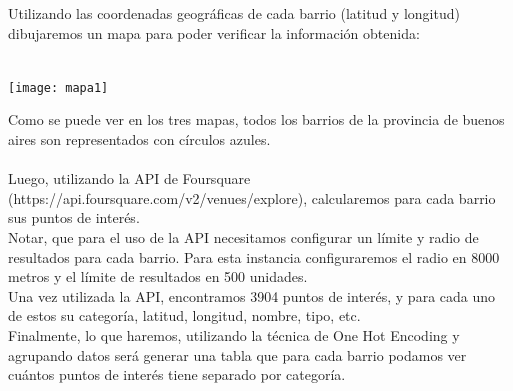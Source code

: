 \documentclass[12pt,a4paper]{tesis}
\begin{document}
Utilizando las coordenadas geográficas de cada barrio (latitud y longitud) dibujaremos un mapa para poder verificar la información obtenida:\\ \\
\centerline{
	\texttt{[image: mapa1]}
}


Como se puede ver en los tres mapas, todos los barrios de la provincia de buenos aires son representados con círculos azules.
\\ \\
Luego, utilizando la API de Foursquare (https://api.foursquare.com/v2/venues/explore), calcularemos para cada barrio sus puntos de interés. \\
Notar, que para el uso de la API necesitamos configurar un límite y radio de resultados para cada barrio. Para esta instancia configuraremos el radio en 8000 metros y el límite de resultados en 500 unidades. \\
Una vez utilizada la API, encontramos 3904 puntos de interés, y para cada uno de estos su categoría, latitud, longitud, nombre, tipo, etc.\\
Finalmente, lo que haremos, utilizando la técnica de One Hot Encoding y agrupando datos será generar una tabla que para cada barrio podamos ver cuántos puntos de interés tiene separado por categoría. \\
\end{document}
